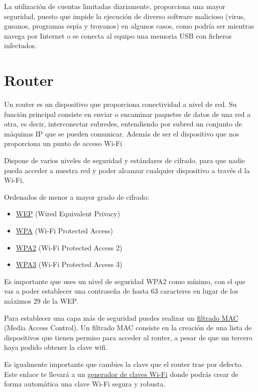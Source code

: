 \documentclass[
  spanish,
  a4paper,
  openany]{book}
\providecommand{\tightlist}{%
  \setlength{\itemsep}{0pt}\setlength{\parskip}{0pt}}
\begin{document}
La utilización de cuentas limitadas diariamente, proporciona una mayor seguridad, puesto que impide la ejecución de diverso software malicioso (virus, gusanos, programas espía y troyanos) en algunos casos, como podría ser mientras navega por Internet o se conecta al equipo una memoria USB con ficheros infectados.

\hypertarget{router}{%
\section{Router}\label{router}}

Un router es un dispositivo que proporciona conectividad a nivel de red. Su función principal consiste en enviar o encaminar paquetes de datos de una red a otra, es decir, interconectar subredes, entendiendo por subred un conjunto de máquinas IP que se pueden comunicar. Además de ser el dispositivo que nos proporciona un punto de acceso Wi-Fi

Dispone de varios niveles de seguridad y estándares de cifrado, para que nadie pueda acceder a nuestra red y poder alcanzar cualquier dispositivo a través d la Wi-Fi.

Ordenados de menor a mayor grado de cifrado:

\begin{itemize}
\tightlist
\item
  \href{https://es.wikipedia.org/wiki/Wired_Equivalent_Privacy}{WEP} (Wired Equivalent Privacy)
\item
  \href{https://es.wikipedia.org/wiki/Wi-Fi_Protected_Access}{WPA} (Wi-Fi Protected Access)
\item
  \href{https://es.wikipedia.org/wiki/WPA2}{WPA2} (Wi-Fi Protected Access 2)
\item
  \href{https://es.wikipedia.org/wiki/WPA3}{WPA3} (Wi-Fi Protected Access 3)
\end{itemize}

Es importante que uses un nivel de seguridad WPA2 como mínimo, con el que vas a poder establecer una contraseña de hasta 63 caracteres en lugar de los máximos 29 de la WEP.

Para establecer una capa más de seguridad puedes realizar un \href{https://es.wikipedia.org/wiki/Filtrado_MAC}{filtrado MAC} (Media Access Control). Un filtrado MAC consiste en la creación de una lista de dispositivos que tienen permiso para acceder al router, a pesar de que un tercero haya podido obtener la clave wifi.

Es igualmente importante que cambies la clave que el router trae por defecto. Este enlace te llevará a un \href{https://bandaancha.eu/generador-claves-wifi}{generador de claves Wi-Fi} donde podrás crear de forma automática una clave Wi-Fi segura y robusta.
\end{document}
